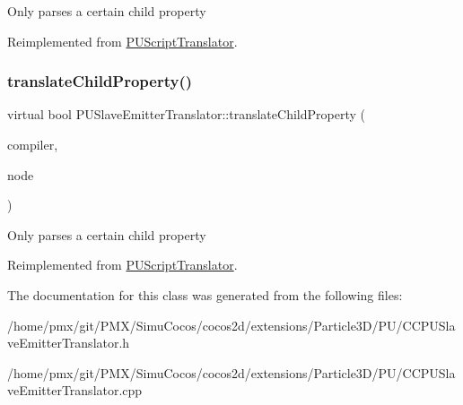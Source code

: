 Only parses a certain child property 

Reimplemented from \hyperlink{classPUScriptTranslator_a0374d83a8a04e57918975d525e0f8fe8}{P\+U\+Script\+Translator}.

\mbox{\label{classPUSlaveEmitterTranslator_a19bfee38e48ef8ce0c300e99539e1761}} 
\subsubsection{\texorpdfstring{translate\+Child\+Property()}{translateChildProperty()}\hspace{0.1cm}{\footnotesize\ttfamily [2/2]}}
{\footnotesize\ttfamily virtual bool P\+U\+Slave\+Emitter\+Translator\+::translate\+Child\+Property (\begin{DoxyParamCaption}\item[{\hyperlink{classPUScriptCompiler}{P\+U\+Script\+Compiler} $\ast$}]{compiler,  }\item[{\hyperlink{classPUAbstractNode}{P\+U\+Abstract\+Node} $\ast$}]{node }\end{DoxyParamCaption})\hspace{0.3cm}{\ttfamily [virtual]}}

Only parses a certain child property 

Reimplemented from \hyperlink{classPUScriptTranslator_a0374d83a8a04e57918975d525e0f8fe8}{P\+U\+Script\+Translator}.



The documentation for this class was generated from the following files\+:\begin{DoxyCompactItemize}
\item 
/home/pmx/git/\+P\+M\+X/\+Simu\+Cocos/cocos2d/extensions/\+Particle3\+D/\+P\+U/C\+C\+P\+U\+Slave\+Emitter\+Translator.\+h\item 
/home/pmx/git/\+P\+M\+X/\+Simu\+Cocos/cocos2d/extensions/\+Particle3\+D/\+P\+U/C\+C\+P\+U\+Slave\+Emitter\+Translator.\+cpp\end{DoxyCompactItemize}

